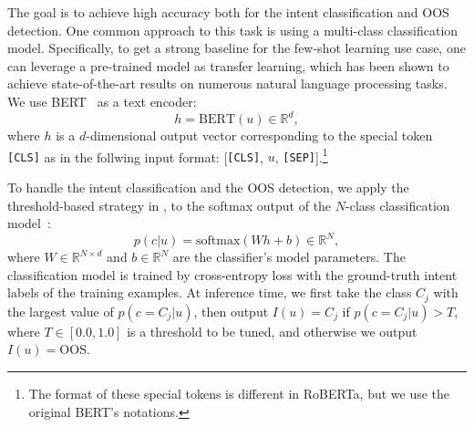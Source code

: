 The goal is to achieve high accuracy both for the intent classification and OOS detection.
One common approach to this task is using a multi-class classification model.
Specifically, to get a strong baseline for the few-shot learning use case, one can leverage a pre-trained model as transfer learning, which has been shown to achieve state-of-the-art results on numerous natural language processing tasks.
We use BERT~\citep{bert,roberta} as a text encoder:
\begin{equation}
    \label{eq:bert}
    h = \mathrm{BERT}(u) \in\mathbb{R}^{d},
\end{equation}
where $h$ is a $d$-dimensional output vector corresponding to the special token {\tt[CLS]} as in the follwing input format: [{\tt[CLS]}, $u$, {\tt[SEP]}].\footnote{The format of these special tokens is different in RoBERTa, but we use the original BERT's notations.}

To handle the intent classification and the OOS detection, we apply the threshold-based strategy in \citet{oos-intent}, to the softmax output of the $N$-class classification model~\citep{softmax_conf}:
\begin{equation}
    \label{eq:softmax}
    p(c | u) = \mathrm{softmax}(W h + b) \in\mathbb{R}^{N},
\end{equation}
where $W\in\mathbb{R}^{N\times d}$ and $b\in\mathbb{R}^{N}$ are the classifier's model parameters.
The classification model is trained by cross-entropy loss with the ground-truth intent labels of the training examples.
At inference time, we first take the class $C_j$ with the largest value of $p(c=C_j|u)$, then output $I(u)=C_j$ if $p(c=C_j|u) > T$, where $T\in[0.0, 1.0]$ is a threshold to be tuned, and otherwise we output $I(u)=\mathrm{OOS}$.


